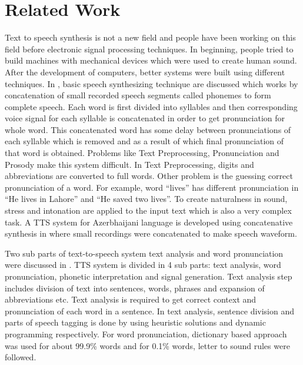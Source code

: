 \chapter{Related Work}

Text to speech synthesis is not a new field and people have been working on this field before electronic
signal processing techniques. In beginning, people tried to build machines with mechanical devices which were used to
create human sound. After the development of computers, better systems were built using different
techniques. In \cite{swetha2013text}, basic speech synthesizing technique are discussed 
which works by concatenation of small recorded speech segments called phonemes to form
complete speech. Each word is first divided into syllables and then corresponding voice signal for each syllable
is concatenated in order to get pronunciation for whole word. This concatenated word has some
delay between pronunciations of each syllable which is removed and as a result of which final
pronunciation of that word is obtained. Problems like Text Preprocessing, Pronunciation and
Prosody make this system difficult. In Text Preprocessing, digits and abbreviations are converted to full
words. Other problem is the guessing correct pronunciation of a word. For example, word “lives” has
different pronunciation in “He lives in Lahore” and “He saved two lives”. To create naturalness in
sound, stress and intonation are applied to the input text which is also a very complex task. A TTS system for Azerbhaijani 
language is developed using concatenative synthesis in \cite{aida2010main} where small recordings 
were concatenated to make speech waveform.

Two sub parts of text-to-speech system text analysis and word pronunciation were discussed in \cite{liberman1992text}. 
TTS system is divided in 4 sub parts: text analysis, word pronunciation, phonetic interpretation and signal
generation. Text analysis step includes division of text into sentences, words, phrases and expansion of abbreviations etc.
Text analysis is required to get correct context and pronunciation of each word in a sentence. In text analysis, 
sentence division and parts of speech tagging is done by using heuristic solutions \cite{riley1989some}
and dynamic programming respectively. For word pronunciation, dictionary based approach was used for about 99.9\%
words and for 0.1\% words, letter to sound rules were followed. 

